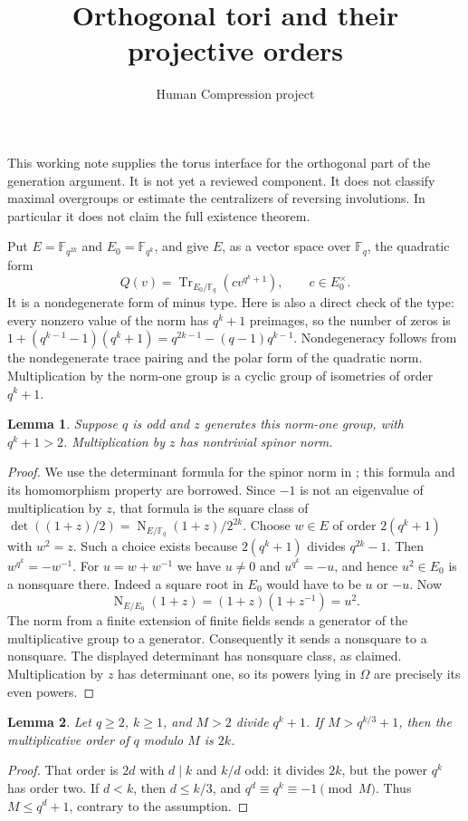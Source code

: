 \documentclass[11pt,a4paper]{article}
\title{Orthogonal tori and their projective orders}
\author{Human Compression project}\date{}
\newtheorem{lemma}{Lemma}
\newcommand{\F}{\mathbb F}
\newcommand{\Om}{\Omega}
\newcommand{\Norm}{\operatorname{N}}
\begin{document}
\maketitle
This working note supplies the torus interface for the orthogonal part of
the generation argument. It is not yet a reviewed component. It does not
classify maximal overgroups or estimate the centralizers of reversing
involutions. In particular it does not claim the full existence theorem.

Put $E=\F_{q^{2k}}$ and $E_0=\F_{q^k}$, and give $E$, as a vector space
over $\F_q$, the quadratic form
\[
 Q(v)=\operatorname{Tr}_{E_0/\F_q}(c v^{q^k+1}),\qquad c\in E_0^\times.
\]
It is a nondegenerate form of minus type. Here is also a direct check of
the type: every nonzero value of the norm has $q^k+1$ preimages, so the
number of zeros is
$1+(q^{k-1}-1)(q^k+1)=q^{2k-1}-(q-1)q^{k-1}$.
Nondegeneracy follows from the nondegenerate trace pairing and the polar
form of the quadratic norm. Multiplication by the norm-one group is a
cyclic group of isometries of order $q^k+1$.

\begin{lemma}\label{lem:spinor}
Suppose $q$ is odd and $z$ generates this norm-one group, with $q^k+1>2$.
Multiplication by $z$ has nontrivial spinor norm.
\end{lemma}
\begin{proof}
We use the determinant formula for the spinor norm in
\cite[Definition~3.1]{MRD}; this formula and its homomorphism property are
borrowed. Since $-1$ is not an eigenvalue of multiplication by $z$, that
formula is the square class of
$\det((1+z)/2)=\Norm_{E/\F_q}(1+z)/2^{2k}$.
Choose $w\in E$ of order $2(q^k+1)$ with $w^2=z$. Such a choice exists
because $2(q^k+1)$ divides $q^{2k}-1$. Then
$w^{q^k}=-w^{-1}$. For $u=w+w^{-1}$ we have $u\ne0$ and
$u^{q^k}=-u$, and hence $u^2\in E_0$ is a nonsquare there.
Indeed a square root in $E_0$ would have to be $u$ or $-u$.
Now
\[
 \Norm_{E/E_0}(1+z)=(1+z)(1+z^{-1})=u^2.
\]
The norm from a finite extension of finite fields sends a generator of
the multiplicative group to a generator. Consequently it sends a
nonsquare to a nonsquare. The displayed determinant has nonsquare class,
as claimed. Multiplication by $z$ has determinant one, so its powers
lying in $\Om$ are precisely its even powers.
\end{proof}

\begin{lemma}\label{lem:degree}
Let $q\ge2$, $k\ge1$, and $M>2$ divide $q^k+1$. If
$M>q^{k/3}+1$, then the multiplicative order of $q$ modulo $M$ is $2k$.
\end{lemma}
\begin{proof}
That order is $2d$ with $d\mid k$ and $k/d$ odd: it divides $2k$, but
the power $q^k$ has order two. If $d<k$, then $d\le k/3$, and
$q^d\equiv q^k\equiv-1\pmod M$. Thus $M\le q^d+1$, contrary to the
assumption.
\end{proof}
\end{document}
